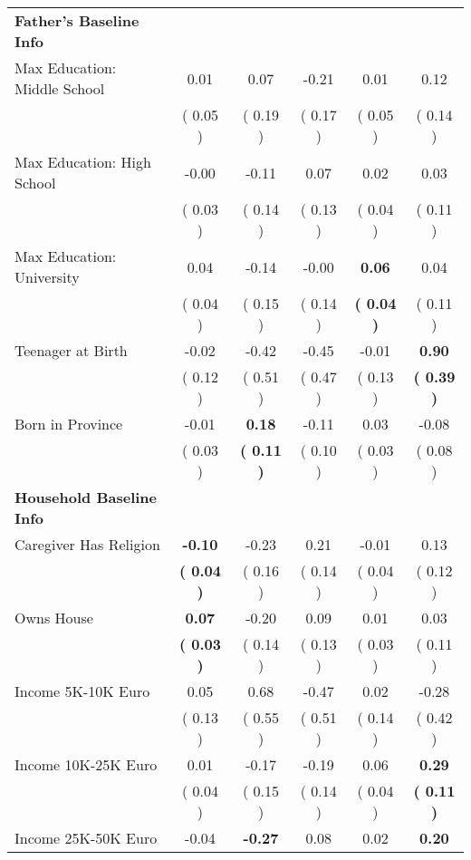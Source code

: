 \begin{table}[H]
{\begin{tabular}{lccccc}
\midrule
\textbf{Father's Baseline Info} \\
\quad Max Education: Middle School &      0.01 &      0.07 &     -0.21 &      0.01 &      0.12 \\
\quad  & (     0.05 ) & (     0.19 )  & (     0.17 )  & (     0.05 ) & (     0.14 ) \\
\quad Max Education: High School &     -0.00 &     -0.11 &      0.07 &      0.02 &      0.03 \\
\quad  & (     0.03 ) & (     0.14 )  & (     0.13 )  & (     0.04 ) & (     0.11 ) \\
\quad Max Education: University &      0.04 &     -0.14 &     -0.00 & \textbf{     0.06} &      0.04 \\
\quad  & (     0.04 ) & (     0.15 )  & (     0.14 )  & \textbf{(     0.04 )} & (     0.11 ) \\
\quad Teenager at Birth &     -0.02 &     -0.42 &     -0.45 &     -0.01 & \textbf{     0.90} \\
\quad  & (     0.12 ) & (     0.51 )  & (     0.47 )  & (     0.13 ) & \textbf{(     0.39 )} \\
\quad Born in Province &     -0.01 & \textbf{     0.18} &     -0.11 &      0.03 &     -0.08 \\
\quad  & (     0.03 ) & \textbf{(     0.11 )}  & (     0.10 )  & (     0.03 ) & (     0.08 ) \\
\midrule
\textbf{Household Baseline Info} \\
\quad Caregiver Has Religion & \textbf{    -0.10} &     -0.23 &      0.21 &     -0.01 &      0.13 \\
\quad  & \textbf{(     0.04 )} & (     0.16 )  & (     0.14 )  & (     0.04 ) & (     0.12 ) \\
\quad Owns House & \textbf{     0.07} &     -0.20 &      0.09 &      0.01 &      0.03 \\
\quad  & \textbf{(     0.03 )} & (     0.14 )  & (     0.13 )  & (     0.03 ) & (     0.11 ) \\
\quad Income 5K-10K Euro &      0.05 &      0.68 &     -0.47 &      0.02 &     -0.28 \\
\quad  & (     0.13 ) & (     0.55 )  & (     0.51 )  & (     0.14 ) & (     0.42 ) \\
\quad Income 10K-25K Euro &      0.01 &     -0.17 &     -0.19 &      0.06 & \textbf{     0.29} \\
\quad  & (     0.04 ) & (     0.15 )  & (     0.14 )  & (     0.04 ) & \textbf{(     0.11 )} \\
\quad Income 25K-50K Euro &     -0.04 & \textbf{    -0.27} &      0.08 &      0.02 & \textbf{     0.20} \\

\end{tabular}}
\end{table}
